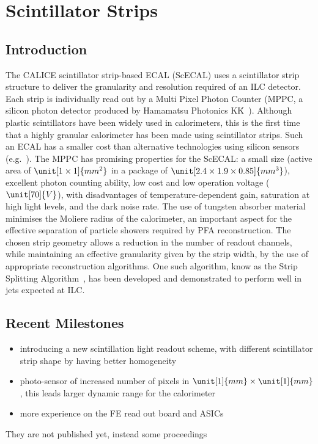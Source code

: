 \section{Scintillator Strips}
\subsection{Introduction}

The CALICE scintillator strip-based ECAL (ScECAL) uses a scintillator  strip
structure to deliver the granularity and resolution required of an ILC detector.
Each strip is individually read out by a Multi Pixel Photon Counter (MPPC, a
silicon photon detector produced by Hamamatsu Photonics K\.K\.~\cite{Gomi:2007zz}). Although
plastic scintillators have been widely used in calorimeters, this is the first
time that a highly granular calorimeter has been made using scintillator strips.
Such an ECAL has a smaller cost than alternative technologies using silicon
sensors (e.g.~\cite{1748-0221-3-08-P08001}). The MPPC has promising properties for the ScECAL: a small
size (active area of $\unit[1 \times 1]{mm^2}$ in a package of $\unit[2.4 \times 1.9 \times 0.85]{mm^3}$), excellent
photon counting ability, low cost and low operation voltage ($\unit[70]{V}$), with
disadvantages of temperature-dependent gain, saturation at high light levels,
and the dark noise rate. The use of tungsten absorber material
minimises the Moliere radius of the calorimeter, an important aspect for the
effective separation of particle showers required by PFA reconstruction. The
chosen strip geometry allows a reduction in the number of readout channels,
while maintaining an effective granularity given by the strip width, by the use
of appropriate reconstruction algorithms. One such algorithm, know as the Strip
Splitting Algorithm~\cite{Kotera2015}, has been developed and demonstrated to perform well in
jets expected at ILC.

\subsection{Recent Milestones}
\begin{itemize}
	\item introducing a new scintillation light readout scheme, with different scintillator strip shape by having better homogeneity
	\item photo-sensor of increased number of pixels in $\unit[1]{mm}\times\unit[1]{mm}$, this leads larger dynamic range for the calorimeter
	\item more experience on the FE read out board and ASICs
\end{itemize}
They are not published yet, instead some proceedings

